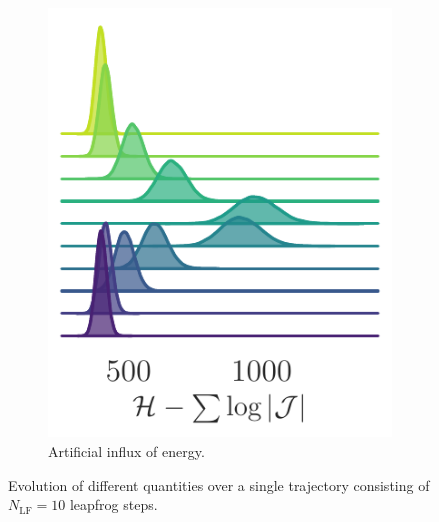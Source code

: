 \documentclass[a4paper,11pt]{article}
\begin{document}
\begin{figure}[htpb]
\begin{subfigure}[t]{0.318\textwidth}
        \includegraphics[width=\textwidth]{assets/ridgeplots/hwf.pdf}
        \caption{\label{fig:hwf_ridgeplot}Artificial influx of energy.}
    \end{subfigure}
    \caption{\label{fig:ridgeplots}Evolution of different quantities over a
    single trajectory consisting of $N_{\mathrm{LF}} = 10$ leapfrog steps.}%
\end{figure}
%
\end{document}
